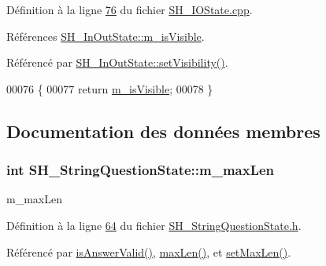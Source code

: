 Définition à la ligne \hyperlink{SH__IOState_8cpp_source_l00076}{76} du fichier \hyperlink{SH__IOState_8cpp_source}{S\-H\-\_\-\-I\-O\-State.\-cpp}.



Références \hyperlink{classSH__InOutState_a8fd66b185c9a55f0e84daa97e2acf53a}{S\-H\-\_\-\-In\-Out\-State\-::m\-\_\-is\-Visible}.



Référencé par \hyperlink{classSH__InOutState_a7fdfaa6f600f0ac4a96f238a038ba9ad}{S\-H\-\_\-\-In\-Out\-State\-::set\-Visibility()}.


\begin{DoxyCode}
00076                                \{
00077     \textcolor{keywordflow}{return} \hyperlink{classSH__InOutState_a8fd66b185c9a55f0e84daa97e2acf53a}{m\_isVisible};
00078 \}
\end{DoxyCode}


\subsection{Documentation des données membres}
\hypertarget{classSH__StringQuestionState_ac001a12ae5939116282ec21920a8e7d1}{
\subsubsection[{m\-\_\-max\-Len}]{\setlength{\rightskip}{0pt plus 5cm}int S\-H\-\_\-\-String\-Question\-State\-::m\-\_\-max\-Len\hspace{0.3cm}{\ttfamily [private]}}}\label{classSH__StringQuestionState_ac001a12ae5939116282ec21920a8e7d1}


m\-\_\-max\-Len 



Définition à la ligne \hyperlink{SH__StringQuestionState_8h_source_l00064}{64} du fichier \hyperlink{SH__StringQuestionState_8h_source}{S\-H\-\_\-\-String\-Question\-State.\-h}.



Référencé par \hyperlink{classSH__StringQuestionState_a51448b87ffdb9279eaa5e7cc3ff73ce9}{is\-Answer\-Valid()}, \hyperlink{classSH__StringQuestionState_a6dce486c3484c28406b234b5f2f91288}{max\-Len()}, et \hyperlink{classSH__StringQuestionState_a7b8ca17302c0953e0ce4a5412f3b96b5}{set\-Max\-Len()}.

